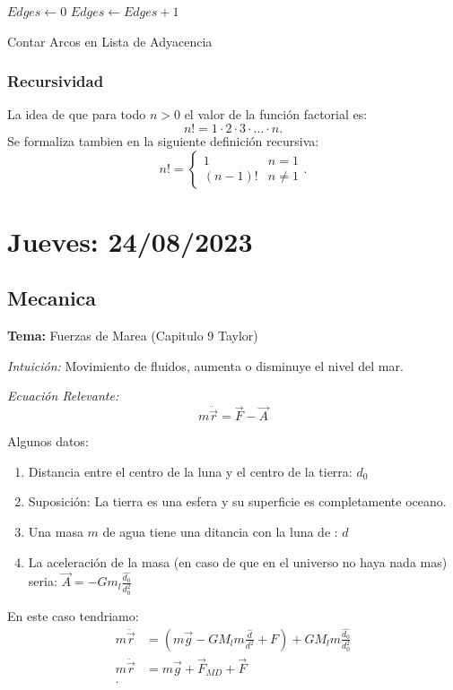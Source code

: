 \documentclass{report}
\begin{document}
  \begin{algorithm}
    $Edges\leftarrow 0$\;
     {
       {
	 {
	  $Edges \leftarrow Edges+1$\;
	}
      }
    }
    \caption{Contar Arcos en Lista de Adyacencia}
  \end{algorithm}

  \subsection{Recursividad}

  La idea de que para todo $n>0$ el valor de la función factorial es: \[
  n! = 1\cdot 2\cdot 3\cdot \ldots\cdot n
  .\] Se formaliza tambien en la siguiente definición recursiva: \[
  n! = \left\{ \begin{matrix} 1 & n=1 \\ (n-1)! & n\neq 1 \end{matrix}  \right.
  .\]

  \chapter{Jueves: 24/08/2023}
  \section{Mecanica}
  \textbf{Tema: } Fuerzas de Marea (Capitulo 9 Taylor)

  \textit{Intuición: } Movimiento de fluidos, aumenta o disminuye el nivel del mar.

  \textit{Ecuación Relevante: }
  \begin{equation}
    m\ddot{\Vec{r}} = \Vec{F} - \Vec{A} \label{eq:Ac}
  \end{equation}

  Algunos datos:
  \begin{enumerate}
    \item Distancia entre el centro de la luna y el centro de la tierra: $d_0$
    \item Suposición: La tierra es una esfera y su superficie es completamente oceano.
    \item Una masa $m$ de agua tiene una ditancia con la luna de : $d$
    \item La aceleración de la masa (en caso de que en el universo no haya nada mas) seria: $\Vec{A}=-Gm_l \frac{\hat{d_0}}{d_0^2}$
  \end{enumerate}

  En este caso tendriamo:
  \begin{align*}
    m\ddot{\Vec{r}} &= \left( m\Vec{g} - GM_lm \frac{\hat{d}}{d^2} + F\right) + GM_lm \frac{\hat{d_0}}{d_0^2}\\
    m\ddot{\Vec{r}} &= m\Vec{g} + \Vec{F}_{MD} + \Vec{F} \\
  .\end{align*}
\end{document}
